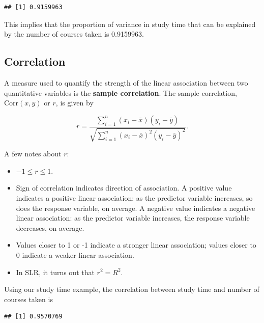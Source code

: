 \documentclass[
]{book}
\newenvironment{Shaded}{\begin{snugshade}}{\end{snugshade}}
\newcommand{\FunctionTok}[1]{\textcolor[rgb]{0.13,0.29,0.53}{\textbf{#1}}}
\newcommand{\NormalTok}[1]{#1}
\newcommand{\SpecialCharTok}[1]{\textcolor[rgb]{0.81,0.36,0.00}{\textbf{#1}}}
\providecommand{\tightlist}{%
  \setlength{\itemsep}{0pt}\setlength{\parskip}{0pt}}
\begin{document}
\begin{verbatim}
## [1] 0.9159963
\end{verbatim}

This implies that the proportion of variance in study time that can be explained by the number of courses taken is 0.9159963.

\subsection{Correlation}\label{correlation}

A measure used to quantify the strength of the linear association between two quantitative variables is the \textbf{sample correlation}. The sample correlation, \(\mbox{Corr}(x,y)\) or \(r\), is given by

\begin{equation} 
r = \frac{\sum\limits_{i=1}^{n}(x_i - \bar{x})(y_i - \bar{y})}{\sqrt{\sum\limits_{i=1}^{n}(x_i - \bar{x})^{2}(y_i - \bar{y})^{2}}}.
\label{eq:corr}
\end{equation}

A few notes about \(r\):

\begin{itemize}
\tightlist
\item
  \(-1 \leq r \leq 1\).
\item
  Sign of correlation indicates direction of association. A positive value indicates a positive linear association: as the predictor variable increases, so does the response variable, on average. A negative value indicates a negative linear association: as the predictor variable increases, the response variable decreases, on average.
\item
  Values closer to 1 or -1 indicate a stronger linear association; values closer to 0 indicate a weaker linear association.
\item
  In SLR, it turns out that \(r^2 = R^2\).
\end{itemize}

Using our study time example, the correlation between study time and number of courses taken is

\begin{Shaded}
\end{Shaded}

\begin{verbatim}
## [1] 0.9570769
\end{verbatim}
\end{document}
